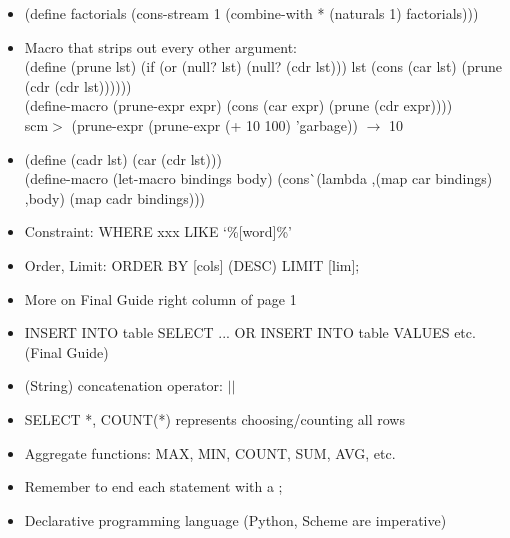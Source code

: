 \documentclass{article}
\begin{document}
\begin{itemize}
\begin{itemize}
		(car nat) $\longrightarrow$ 0; (cdr nat) $\longrightarrow$ \#[promise (not forced)] \\
		(car (cdr-stream nat)) $\longrightarrow$ 1 \\
		(car (cdr-stream (cdr-stream nat))) $\longrightarrow$ 2 \\
		(cdr-stream nat) $\longrightarrow$ (1 . \#[promise (forced)])
		\item (define (compute-rest n) (print 'evaluating!) (cons-stream n nil)) $\longrightarrow$ compute-rest \\
		(define s (cons-stream 0 (compute-rest 1))) $\longrightarrow$ s \\
		(car (cdr-stream s)) $\longrightarrow$ evaluating! \textbackslash n 1 \\
		(car (cdr-stream s)) $\longrightarrow$ 1

	\end{itemize}
	\item (define factorials (cons-stream 1 (combine-with * (naturals 1) factorials)))
	\item Macro that strips out every other argument: \\
	(define (prune lst)
	{\color{green}(}if {\color{blue}(}or (null? lst) (null? (cdr lst)){\color{blue})} lst
	{\color{red}(}cons (car lst) (prune (cdr (cdr lst))){\color{red})}{\color{green})}) \\
	(define-macro (prune-expr expr)
	(cons (car expr) (prune (cdr expr)))) \\
	scm$>$ (prune-expr (prune-expr (+ 10 100) 'garbage)) $\longrightarrow$ 10
	\item (define (cadr lst) (car (cdr lst))) \\
	(define-macro (let-macro bindings body) (cons \`\,(lambda ,(map car bindings) ,body) (map cadr bindings))) \\

\end{itemize}



\begin{itemize}
	\item Constraint: WHERE xxx LIKE `\%[word]\%'
	\item Order, Limit: ORDER BY [cols] (DESC) LIMIT [lim];
	\item More on Final Guide right column of page 1
	\item INSERT INTO table SELECT ... OR INSERT INTO table VALUES etc. (Final Guide)
	\item (String) concatenation operator: $||$
	\item SELECT *, COUNT(*) represents choosing/counting all rows
	\item Aggregate functions: MAX, MIN, COUNT, SUM, AVG, etc.
	\item Remember to end each statement with a ;
	\item Declarative programming language (Python, Scheme are imperative)
\end{itemize}
\end{document}
